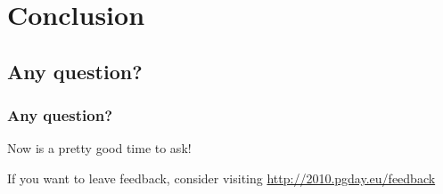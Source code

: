 \documentclass[english]{beamer}
\begin{document}
\section{Conclusion}

\subsection{Any question?}

\begin{frame}[fragile]
  \frametitle{Any question?}

  \begin{center}
    Now is a pretty good time to ask!
  \end{center}

  \linebreak
  \begin{center}
    If you want to leave feedback, consider visiting
    \url{http://2010.pgday.eu/feedback}
  \end{center}
\end{frame}
\end{document}
